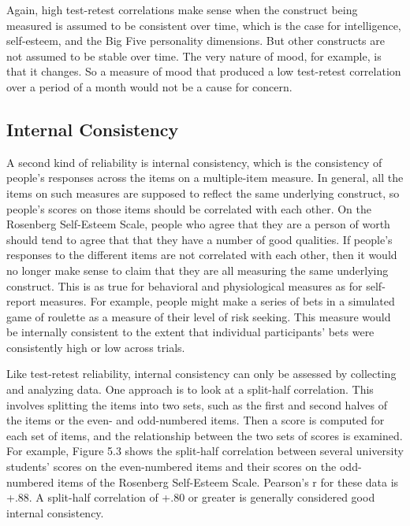 Again, high test-retest correlations make sense when the construct being measured is assumed to be consistent over time, which is the case for intelligence, self-esteem, and the Big Five personality dimensions. But other constructs are not assumed to be stable over time. The very nature of mood, for example, is that it changes. So a measure of mood that produced a low test-retest correlation over a period of a month would not be a cause for concern.


\subsection{Internal Consistency}

A second kind of reliability is internal consistency, which is the consistency of people's responses across the items on a multiple-item measure. In general, all the items on such measures are supposed to reflect the same underlying construct, so people's scores on those items should be correlated with each other. On the Rosenberg Self-Esteem Scale, people who agree that they are a person of worth should tend to agree that that they have a number of good qualities. If people's responses to the different items are not correlated with each other, then it would no longer make sense to claim that they are all measuring the same underlying construct. This is as true for behavioral and physiological measures as for self-report measures. For example, people might make a series of bets in a simulated game of roulette as a measure of their level of risk seeking. This measure would be internally consistent to the extent that individual participants' bets were consistently high or low across trials.

Like test-retest reliability, internal consistency can only be assessed by collecting and analyzing data. One approach is to look at a split-half correlation. This involves splitting the items into two sets, such as the first and second halves of the items or the even- and odd-numbered items. Then a score is computed for each set of items, and the relationship between the two sets of scores is examined. For example, Figure 5.3 shows the split-half correlation between several university students' scores on the even-numbered items and their scores on the odd-numbered items of the Rosenberg Self-Esteem Scale. Pearson's r for these data is +.88. A split-half correlation of +.80 or greater is generally considered good internal consistency.


